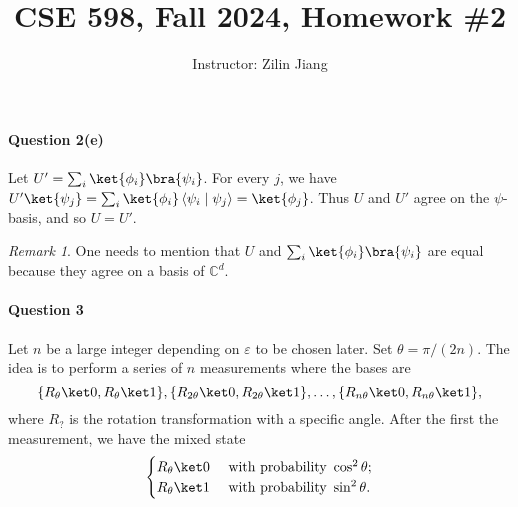\documentclass[12pt,answers]{exam}
\title{CSE 598, Fall 2024, Homework \#2}
\date{}
\author{Instructor: Zilin Jiang}
\theoremstyle{remark}
\newtheorem*{remark}{Remark}
\newcommand{\inprod}[2]{\left\langle #1 \mid #2 \right\rangle}
\newcommand{\C}{\mathbb{C}}
\newcommand{\eps}{\varepsilon}
\newcommand{\bs}[2]{\{#1,#2\}}
\begin{document}
\maketitle

\paragraph{Question 2(e)} Let $U' = \sum_{i} \ket{\phi_i}\bra{\psi_i}$. For every $j$, we have $U'\ket{\psi_j} = \sum_{i} \ket{\phi_i}\inprod{\psi_i}{\psi_j} = \ket{\phi_j}$. Thus $U$ and $U'$ agree on the $\psi$-basis, and so $U = U'$.

\begin{remark}
    One needs to mention that $U$ and $\sum_{i} \ket{\phi_i}\bra{\psi_i}$ are equal because they agree on a basis of $\C^d$.
\end{remark}

\paragraph{Question 3} Let $n$ be a large integer depending on $\eps$ to be chosen later. Set $\theta = \pi/(2n)$. The idea is to perform a series of $n$ measurements where the bases are
$$
  \bs{R_\theta\ket0}{R_\theta\ket1}, \bs{R_{2\theta}\ket0}{R_{2\theta}\ket1}, \dots, \bs{R_{n\theta}\ket0}{R_{n\theta}\ket1},
$$
where $R_?$ is the rotation transformation with a specific angle. After the first the measurement, we have the mixed state
$$
\begin{cases}
  R_{\theta}\ket0 & \text{ with probability } \cos^2\theta;\\
  R_\theta\ket1   & \text{ with probability } \sin^2\theta.
\end{cases}
$$
\end{document}
